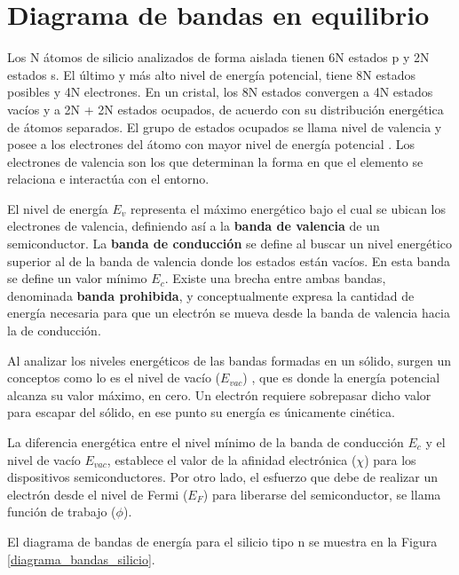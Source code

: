 \section{Diagrama de bandas en equilibrio}

Los N átomos de silicio analizados de forma aislada tienen 6N estados p y 2N estados s. El último y más alto nivel de energía potencial, tiene 8N estados posibles y 4N electrones. En un cristal, los 8N estados convergen a 4N estados vacíos y a 2N + 2N estados ocupados, de acuerdo con su distribución energética de átomos separados. El grupo de estados ocupados se llama nivel de valencia y posee a los electrones del átomo con mayor nivel de energía potencial \cite{b7}\cite{b11}. Los electrones de valencia son los que determinan la forma en que el elemento se relaciona e interactúa con el entorno. 

El nivel de energía $E_{v}$ representa el máximo energético bajo el cual se ubican los electrones de valencia, definiendo así a la \textbf{banda de valencia} de un semiconductor. La \textbf{banda de conducción} se define al buscar un nivel energético superior al de la banda de valencia donde los estados están vacíos. En esta banda se define un valor mínimo $E_{c}$. Existe una brecha entre ambas bandas, denominada \textbf{banda prohibida}, y conceptualmente expresa la cantidad de energía necesaria para que un electrón se mueva desde la banda de valencia hacia la de conducción. 

Al analizar los niveles energéticos de las bandas formadas en un sólido, surgen un conceptos como lo es el nivel de vacío ($E_{vac}$) \cite{b4}, que es donde la energía potencial alcanza su valor máximo, en cero. Un electrón requiere sobrepasar dicho valor para escapar del sólido, en ese punto su energía es únicamente cinética.

La diferencia energética entre el nivel mínimo de la banda de conducción $E_{c}$ y el nivel de vacío $E_{vac}$, establece el valor de la afinidad electrónica ($\chi$) para los dispositivos semiconductores. Por otro lado, el esfuerzo que debe de realizar un electrón desde el nivel de Fermi ($E_{F}$) \cite{b11} para liberarse del semiconductor, se llama función de trabajo ($\phi$).

El diagrama de bandas de energía para el silicio tipo n se muestra en la Figura \ref{diagrama_bandas_silicio}. 

